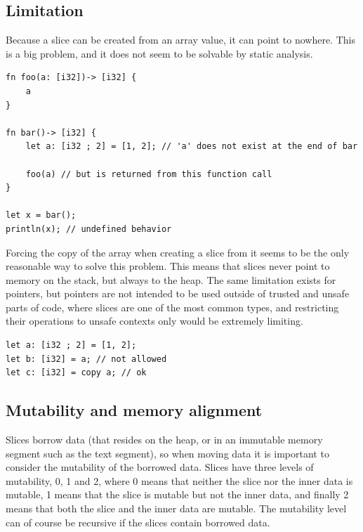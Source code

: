 \subsection{Limitation}%
\label{sec:compound:slice_lim}

Because a slice can be created from an array value, it can point to nowhere.
This is a big problem, and it does not seem to be solvable by static analysis.

\begin{lstlisting}[style=coloredverbatim]
fn foo(a: [i32])-> [i32] {
    a
}

fn bar()-> [i32] {
    let a: [i32 ; 2] = [1, 2]; // 'a' does not exist at the end of bar

    foo(a) // but is returned from this function call
}

let x = bar();
println(x); // undefined behavior
\end{lstlisting}

Forcing the copy of the array when creating a slice from it seems to be the only
reasonable way to solve this problem. This means that slices never point to
memory on the stack, but always to the heap. The same limitation exists for
pointers, but pointers are not intended to be used outside of
trusted and unsafe parts of code, where slices are one of the most common types,
and restricting their operations to unsafe contexts only would be extremely
limiting.

\begin{lstlisting}[style=coloredverbatimError]
let a: [i32 ; 2] = [1, 2];
let b: [i32] = a; // not allowed
let c: [i32] = copy a; // ok
\end{lstlisting}



\subsection{Mutability and memory alignment}

Slices borrow data (that resides on the heap, or in an immutable memory segment
such as the text segment), so when moving data it is important to consider the mutability of the
borrowed data. Slices have three levels of mutability, 0, 1 and 2, where 0 means
that neither the slice nor the inner data is mutable, 1 means that the slice is
mutable but not the inner data, and finally 2 means that both the slice and the
inner data are mutable. The mutability level can of course be recursive if the
slices contain borrowed data.



